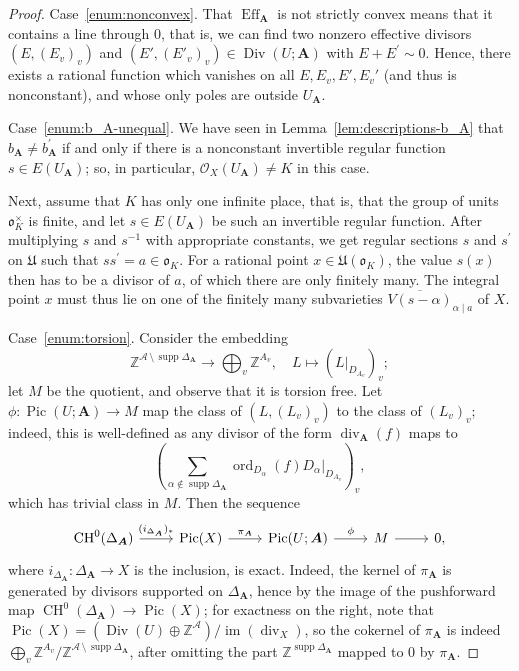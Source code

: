 \documentclass[a4paper, twoside, 10pt]{amsart}
\newcommand{\uA}{{\boldsymbol{A}}}
\newcommand{\cA}{\mathcal{A}}
\newcommand{\cO}{\mathcal{O}}
\newcommand{\mU}{\mathfrak{U}}
\newcommand{\fo}{\mathfrak{o}}
\newcommand{\ZZ}{\mathbb{Z}}
\DeclareMathOperator{\CH}{CH}
\DeclareMathOperator{\Div}{Div}
\DeclareMathOperator{\sdiv}{div}
\DeclareMathOperator{\Eff}{Eff}
\DeclareMathOperator{\im}{im}
\DeclareMathOperator{\ord}{ord}
\DeclareMathOperator{\Pic}{Pic}
\DeclareMathOperator{\supp}{supp}
\theoremstyle{definition}
\begin{document}
\begin{proof}
  Case~\eqref{enum:nonconvex}.
  That $\Eff_\uA$ is not strictly convex means that it contains a line through $0$, that is, we can find two nonzero effective divisors $(E, (E_v)_v)$ and $(E', (E'_v)_v)\in\Div(U;\uA)$ with $E+E^\prime\sim 0$. Hence, there exists a rational function which vanishes on all $E,E_v, E', E_v'$ (and thus is nonconstant), and whose only poles are outside $U_\uA$.

  \smallskip

  Case~\eqref{enum:b_A-unequal}.
  We have seen in Lemma~\ref{lem:descriptions-b_A} that $b_\uA \neq b^\prime_\uA$ if and only if there is a nonconstant invertible regular function $s\in E(U_\uA)$; so, in particular, $\cO_X(U_\uA)\ne K$ in this case.

  Next, assume that $K$ has only one infinite place, that is, that the group of units $\fo_K^\times$ is finite, and let $s\in E(U_\uA)$ be such an invertible regular function. After multiplying $s$ and $s^{-1}$ with appropriate constants, we get regular sections $s$ and $s^\prime$ on $\mU$ such that $ss^\prime=a\in\fo_K$. For a rational point $x\in\mU(\fo_K)$, the value $s(x)$ then has to be a divisor of $a$, of which there are only finitely many.
  The integral point $x$ must thus lie on one of the finitely many subvarieties $\overline{V(s-\alpha)}_{\alpha\mid a}$ of $X$.

  \smallskip
  
  Case~\eqref{enum:torsion}. Consider the embedding
  \[
    \ZZ^{\cA \,\setminus\, \supp{\Delta_\uA}} \to \bigoplus_v\ZZ^{A_v}, \quad
    L\mapsto (L|_{D_{A_v}})_v;
  \]
  let $M$ be the quotient, and observe that it is torsion free. Let $\phi\colon \Pic(U;\uA) \to M$ map the class of $(L, (L_v)_v)$ to the class of $(L_v)_v$; indeed, this is well-defined as any divisor of the form $\sdiv_\uA(f)$ maps to 
  \[
    \left(\sum_{\alpha \not\in\supp\Delta_\uA} \ord_{D_\alpha}(f) D_\alpha \bigg|_{D_{A_v}}\right)_v,
  \]
  which has trivial class in $M$. Then the sequence
  \begin{equation}
    \begin{tikzcd}
    \CH^0(\Delta_\uA) \arrow[r, "(i_{\Delta_\uA})_*"] &
    \Pic(X) \arrow[r, "\pi_\uA"] &
    \Pic(U;\uA) \arrow[r, "\phi"] &
    M \arrow[r] &
    0,
    \end{tikzcd}
  \end{equation}
  where $i_{\Delta_\uA}\colon \Delta_\uA \to X$ is the inclusion, is exact.
  Indeed, the kernel of $\pi_\uA$ is generated by divisors supported on $\Delta_\uA$, hence by the image of the pushforward map $\CH^0(\Delta_\uA)\to \Pic(X)$;
  for exactness on the right, note that $\Pic(X)=(\Div(U)\oplus\ZZ^\cA)/\im(\sdiv_X)$, so the cokernel of $\pi_\uA$ is indeed $\bigoplus_v\ZZ^{A_v}/\ZZ^{\cA\,\setminus\,\supp\Delta_\uA}$, after omitting the part $\ZZ^{\supp \Delta_\uA}$ mapped to $0$ by $\pi_\uA$.


\end{proof}
\end{document}
